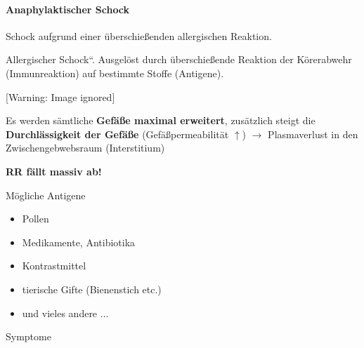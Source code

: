\documentclass{article}
\newcommand\gEs[1]{\textbf{\textcolor[rgb]{0.0,0.0,0.5019608}{#1}}}
\newcommand\gEs[1]{\textbf{\textcolor[rgb]{0.0,0.0,0.5019608}{#1}}}
\newcommand\gZ[1]{\textcolor[rgb]{0.5019608,0.5019608,0.5019608}{#1}}
\begin{document}
\paragraph{Anaphylaktischer Schock}
{\mdseries
Schock aufgrund einer \"uberschie{\ss}enden allergischen Reaktion.}

{\mdseries
{\quotedblbase}Allergischer Schock{\textquotedblleft}. Ausgel\"ost durch
\"uberschie{\ss}ende Reaktion der K\"orerabwehr (Immunreaktion) auf
bestimmte Stoffe (Antigene). }

\begin{center}
 [Warning: Image ignored] %

\end{center}
{\mdseries
Es werden s\"amtliche \gEs{Gef\"a{\ss}e maximal
erweitert}, zus\"atzlich steigt die
\gEs{Durchl\"assigkeit der Gef\"a{\ss}e}
\gZ{(Gef\"a{\ss}permeabilit\"at ${\uparrow}$)}
${\rightarrow}$  Plasmaverlust in den Zwischengebwebsraum
\gZ{(Interstitium)} }

{\mdseries
\gEs{RR f\"allt massiv ab!}}

{\mdseries\color{black}
M\"ogliche Antigene}

\begin{itemize}
\item {\mdseries
Pollen}

\item {\mdseries
Medikamente, Antibiotika}

\item {\mdseries
Kontrastmittel}

\item {\mdseries
tierische Gifte (Bienenstich etc.)}

\item {\mdseries
und vieles andere ...}

\end{itemize}
{\mdseries\color{black}
Symptome%
%
}
\end{document}
